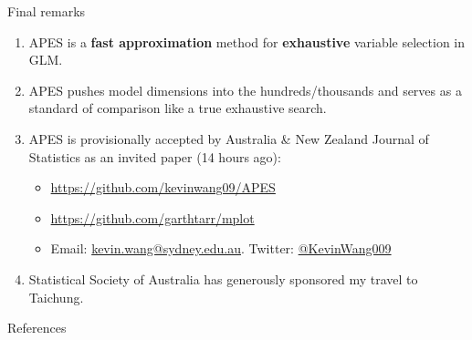 \documentclass[12pt,aspectratio=169]{beamer}
\begin{document}
\begin{frame}{Final remarks}
\begin{enumerate}
	\item APES is a \textbf{fast approximation} method for \textbf{exhaustive} variable selection in GLM. 
	\item APES pushes model dimensions into the hundreds/thousands and serves as a standard of comparison like a true exhaustive search. 
	\item APES is provisionally accepted by Australia \& New Zealand Journal of Statistics as an invited paper (14 hours ago): 
	\begin{itemize}
		\item \href{https://github.com/kevinwang09/APES}{https://github.com/kevinwang09/APES}
		\item \href{https://github.com/garthtarr/mplot}{https://github.com/garthtarr/mplot}
		\item Email: \href{mailto:kevin.wang@sydney.edu.au}{kevin.wang@sydney.edu.au}. Twitter: \href{https://twitter.com/KevinWang009}{@KevinWang009}
	\end{itemize}
   
    \item Statistical Society of Australia has generously sponsored my travel to Taichung. 
\end{enumerate}
\end{frame}



\begin{frame}{References}

\scriptsize

\end{frame}
\end{document}
